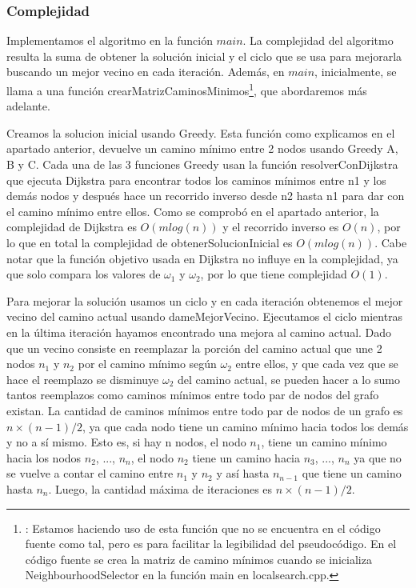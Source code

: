 \subsubsection{Complejidad}

Implementamos el algoritmo en la función $main$. La complejidad del algoritmo resulta la suma de obtener la solución inicial y el ciclo que se usa para mejorarla buscando un mejor vecino en cada iteración. 
Además, en $main$, inicialmente, se llama a una función crearMatrizCaminosMinimos\footnote{\label{$crearMatrixCaminosMinimos$}: Estamos haciendo uso de esta función que no se encuentra en el código fuente como tal, pero es para facilitar la legibilidad del pseudocódigo. En el código fuente se crea la matriz de camino mínimos cuando se inicializa NeighbourhoodSelector en la función main en localsearch.cpp.}, que abordaremos más adelante.

Creamos la solucion inicial usando Greedy. Esta función como explicamos en el apartado anterior, devuelve un camino mínimo entre 2 nodos usando Greedy A, B y C. Cada una de las 3 funciones Greedy usan la función resolverConDijkstra que ejecuta Dijkstra para encontrar todos los caminos mínimos entre n1 y los demás nodos y después hace un recorrido inverso desde n2 hasta n1 para dar con el camino mínimo entre ellos. Como se comprobó en el apartado anterior, la complejidad de Dijkstra es $O(m log(n))$ y el recorrido inverso es $O(n)$, por lo que en total la complejidad de obtenerSolucionInicial es $O(m log(n))$. Cabe notar que la función objetivo usada en Dijkstra no influye en la complejidad, ya que solo compara los valores de $\omega_1$ y $\omega_2$, por lo que tiene complejidad $O(1)$.

Para mejorar la solución usamos un ciclo y en cada iteración obtenemos el mejor vecino del camino actual usando dameMejorVecino. Ejecutamos el ciclo mientras en la última iteración hayamos encontrado una mejora al camino actual. 
Dado que un vecino consiste en reemplazar la porción del camino actual que une 2 nodos $n_1$ y $n_2$ por el camino mínimo según $\omega_2$ entre ellos, y que cada vez que se hace el reemplazo se disminuye $\omega_2$ del camino actual, se pueden hacer a lo sumo tantos reemplazos como caminos mínimos entre todo par de nodos del grafo existan. 
La cantidad de caminos mínimos entre todo par de nodos de un grafo es $n \times (n-1) / 2$, ya que cada nodo tiene un camino mínimo hacia todos los demás y no a sí mismo. Esto es, si hay n nodos, el nodo $n_1$, tiene un camino mínimo hacia los nodos $n_2$, ..., $n_n$, el nodo $n_2$ tiene un camino hacia $n_3$, ..., $n_n$ ya que no se vuelve a contar el camino entre $n_1$ y $n_2$ y así hasta $n_{n-1}$ que tiene un camino hasta $n_n$.
Luego, la cantidad máxima de iteraciones es $n \times (n-1) / 2$.


